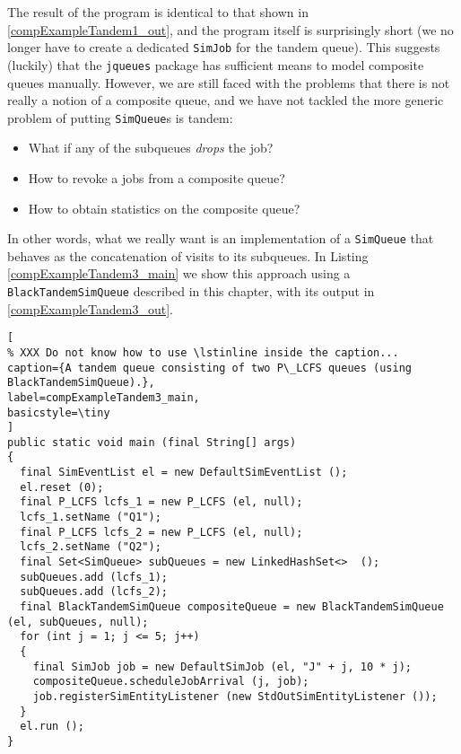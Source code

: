 The result of the program is identical to that shown in \ref{compExampleTandem1_out},
  and the program itself is surprisingly short
  (we no longer have to create a dedicated \lstinline|SimJob| for the tandem queue).
This suggests (luckily) that the \lstinline|jqueues| package has sufficient means to
  model composite queues manually.
However, we are still faced with the problems that there is not really a notion
  of a composite queue, and we have not tackled the more generic problem of
  putting \lstinline|SimQueue|s is tandem:
\begin{itemize}
\item What if any of the subqueues {\em drops} the job?
\item How to revoke a jobs from a composite queue?
\item How to obtain statistics on the composite queue?
\end{itemize}
In other words,
  what we really want is an implementation of a \lstinline|SimQueue|
  that behaves as the concatenation of visits to its subqueues.
In Listing \ref{compExampleTandem3_main} we show this
  approach using a \lstinline|BlackTandemSimQueue|
  described in this chapter,
  with its output in \ref{compExampleTandem3_out}.

\begin{lstlisting}[
% XXX Do not know how to use \lstinline inside the caption...
caption={A tandem queue consisting of two P\_LCFS queues (using BlackTandemSimQueue).},
label=compExampleTandem3_main,
basicstyle=\tiny
]
public static void main (final String[] args)
{    
  final SimEventList el = new DefaultSimEventList ();
  el.reset (0);
  final P_LCFS lcfs_1 = new P_LCFS (el, null);
  lcfs_1.setName ("Q1");
  final P_LCFS lcfs_2 = new P_LCFS (el, null);
  lcfs_2.setName ("Q2");
  final Set<SimQueue> subQueues = new LinkedHashSet<>  ();
  subQueues.add (lcfs_1);
  subQueues.add (lcfs_2);
  final BlackTandemSimQueue compositeQueue = new BlackTandemSimQueue (el, subQueues, null);
  for (int j = 1; j <= 5; j++)
  {
    final SimJob job = new DefaultSimJob (el, "J" + j, 10 * j);
    compositeQueue.scheduleJobArrival (j, job);
    job.registerSimEntityListener (new StdOutSimEntityListener ());
  }
  el.run ();
}
\end{lstlisting}

